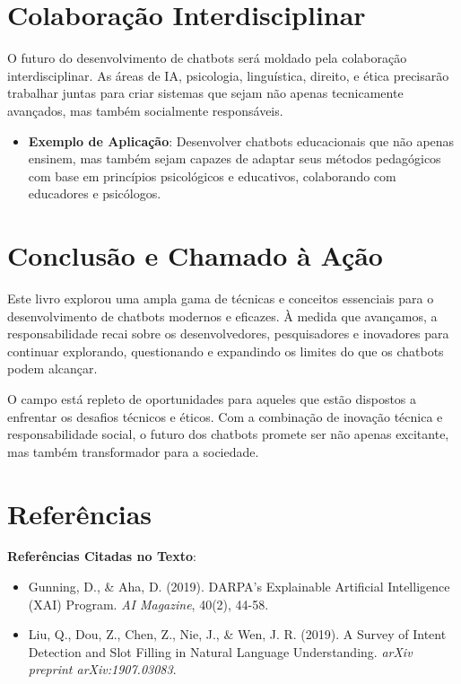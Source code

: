 \documentclass[14pt,a4paper,oneside]{book}
\begin{document}
\section{Colaboração Interdisciplinar}

O futuro do desenvolvimento de chatbots será moldado pela colaboração interdisciplinar. As áreas de IA, psicologia, linguística, direito, e ética precisarão trabalhar juntas para criar sistemas que sejam não apenas tecnicamente avançados, mas também socialmente responsáveis.

\begin{itemize}
	\item \textbf{Exemplo de Aplicação}: Desenvolver chatbots educacionais que não apenas ensinem, mas também sejam capazes de adaptar seus métodos pedagógicos com base em princípios psicológicos e educativos, colaborando com educadores e psicólogos.
\end{itemize}

\section{Conclusão e Chamado à Ação}

Este livro explorou uma ampla gama de técnicas e conceitos essenciais para o desenvolvimento de chatbots modernos e eficazes. À medida que avançamos, a responsabilidade recai sobre os desenvolvedores, pesquisadores e inovadores para continuar explorando, questionando e expandindo os limites do que os chatbots podem alcançar.

O campo está repleto de oportunidades para aqueles que estão dispostos a enfrentar os desafios técnicos e éticos. Com a combinação de inovação técnica e responsabilidade social, o futuro dos chatbots promete ser não apenas excitante, mas também transformador para a sociedade.

\section{Referências}

\textbf{Referências Citadas no Texto}:

\begin{itemize}
	\item Gunning, D., \& Aha, D. (2019). DARPA's Explainable Artificial Intelligence (XAI) Program. \textit{AI Magazine}, 40(2), 44-58.
	\item Liu, Q., Dou, Z., Chen, Z., Nie, J., \& Wen, J. R. (2019). A Survey of Intent Detection and Slot Filling in Natural Language Understanding. \textit{arXiv preprint arXiv:1907.03083}.
\end{itemize}
\end{document}
